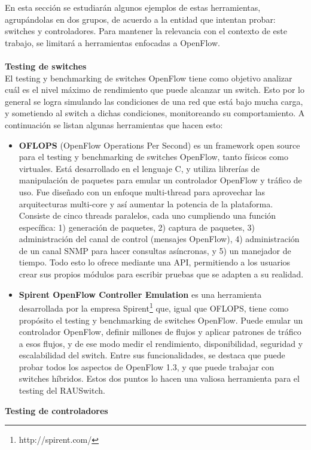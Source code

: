 En esta sección se estudiarán algunos ejemplos de estas herramientas, agrupándolas en dos grupos, de acuerdo a la entidad que intentan probar: switches y controladores. Para mantener la relevancia con el contexto de este trabajo, se limitará a herramientas enfocadas a OpenFlow. \\ \\
\textbf{Testing de switches} \\
El testing y benchmarking de switches OpenFlow tiene como objetivo analizar cuál es el nivel máximo de rendimiento que puede alcanzar un switch. Esto por lo general se logra simulando las condiciones de una red que está bajo mucha carga, y sometiendo al switch a dichas condiciones, monitoreando su comportamiento. A continuación se listan algunas herramientas que hacen esto:
\begin{itemize}
	\item \textbf{OFLOPS} \cite{oflops} (OpenFlow Operations Per Second) es un framework open source para el testing y benchmarking de switches OpenFlow, tanto físicos como virtuales. Está desarrollado en el lenguaje C, y utiliza librerías de manipulación de paquetes para emular un controlador OpenFlow y tráfico de uso. Fue diseñado con un enfoque multi-thread para aprovechar las arquitecturas multi-core y así aumentar la potencia de la plataforma. Consiste de cinco threads paralelos, cada uno cumpliendo una función específica: 1) generación de paquetes, 2) captura de paquetes, 3) administración del canal de control (mensajes OpenFlow), 4) administración de un canal SNMP para hacer consultas asíncronas, y 5) un manejador de tiempo. Todo esto lo ofrece mediante una API, permitiendo a los usuarios crear sus propios módulos para escribir pruebas que se adapten a su realidad.
	\item \textbf{Spirent OpenFlow Controller Emulation} \cite{spirent-controller-emulation} es una herramienta desarrollada por la empresa Spirent\footnote{http://spirent.com/} que, igual que OFLOPS, tiene como propósito el testing y benchmarking de switches OpenFlow. Puede emular un controlador OpenFlow, definir millones de flujos y aplicar patrones de tráfico a esos flujos, y de ese modo medir el rendimiento, disponibilidad, seguridad y escalabilidad del switch. Entre sus funcionalidades, se destaca que puede probar todos los aspectos de OpenFlow 1.3, y que puede trabajar con switches híbridos. Estos dos puntos lo hacen una valiosa herramienta para el testing del RAUSwitch.
\end{itemize}
\textbf{Testing de controladores} \\
